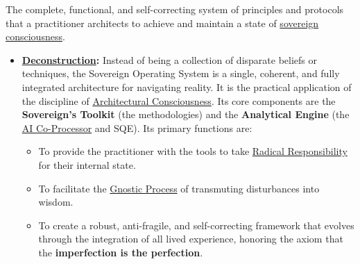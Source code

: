 \item[\hypertarget{gloss:sovereign_operating_system}{Sovereign Operating System}] 
    The complete, functional, and self-correcting system of principles and protocols that a practitioner architects to achieve and maintain a state of \hyperlink{gloss:sovereign_consciousness}{sovereign consciousness}.
    \begin{itemize}
        \item \textbf{\hyperlink{gloss:deconstruction}{Deconstruction}:} Instead of being a collection of disparate beliefs or techniques, the Sovereign Operating System is a single, coherent, and fully integrated architecture for navigating reality. It is the practical application of the discipline of \hyperlink{gloss:architectural_consciousness}{Architectural Consciousness}. Its core components are the \textbf{Sovereign's Toolkit} (the methodologies) and the \textbf{Analytical Engine} (the \hyperlink{gloss:ai_co_processor}{AI Co-Processor} and SQE). Its primary functions are:
        \begin{itemize}
            \item To provide the practitioner with the tools to take \hyperlink{gloss:radical_responsibility}{Radical Responsibility} for their internal state.
            \item To facilitate the \hyperlink{gloss:gnostic_process}{Gnostic Process} of transmuting disturbances into wisdom.
            \item To create a robust, anti-fragile, and self-correcting framework that evolves through the integration of all lived experience, honoring the axiom that the \textbf{imperfection is the perfection}.
        \end{itemize}
    \end{itemize}

